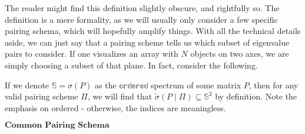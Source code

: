 The reader might find this definition slightly obscure, and rightfully so. The definition is a mere formality, as we will usually only consider a few specific pairing schema, which will hopefully amplify things. With all the technical details aside, we can just say that a pairing scheme tells us which subset of eigenvalue pairs to consider. If one visualizes an array with $N$ objects on two axes, we are simply choosing a subset of that plane. In fact, consider the following.

\begin{remark} If we denote $\mathbb{S} = \sigma(P)$ as the $\mathbb{ordered}$ spectrum of some matrix $P$, then for any valid pairing scheme $\Pi$, we will find that $\tilde{\sigma}(P \mid \Pi) \subseteq \mathbb{S}^2$ by definition. Note the emphasis on ordered - otherwise, the indices are meaningless.
\end{remark}


\newpage

\begin{center}
$\textbf{Common Pairing Schema}$
\end{center}

